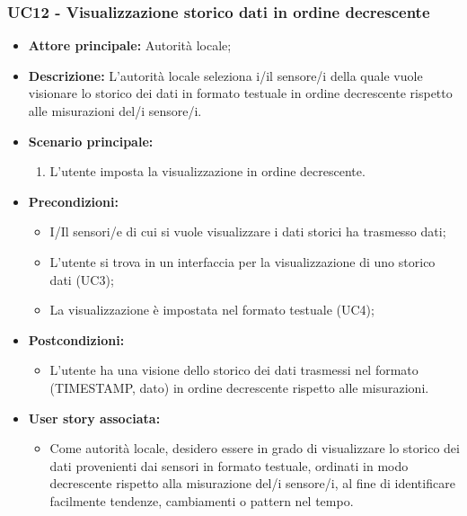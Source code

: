 \subsubsection{UC12 - Visualizzazione storico dati in ordine decrescente}
\begin{itemize}
    \item \textbf{Attore principale:} Autorità locale;
    \item \textbf{Descrizione:} L’autorità locale seleziona i/il sensore/i della quale vuole visionare lo storico dei dati in formato testuale in ordine decrescente rispetto alle misurazioni del/i sensore/i.
    \item \textbf{Scenario principale:}
          \begin{enumerate}
              \item L'utente imposta la visualizzazione in ordine decrescente.
          \end{enumerate}
    \item \textbf{Precondizioni:}
          \begin{itemize}
              \item  I/Il sensori/e di cui si vuole visualizzare i dati storici ha trasmesso dati;
              \item  L'utente si trova in un interfaccia per la visualizzazione di uno storico dati (UC3);
                \item La visualizzazione è impostata nel formato testuale (UC4);

          \end{itemize}
    \item \textbf{Postcondizioni:}
          \begin{itemize}
              \item  L'utente ha una visione dello storico dei dati trasmessi nel formato (TIMESTAMP, dato) in ordine decrescente rispetto alle misurazioni.
          \end{itemize}
    \item \textbf{User story associata:}
          \begin{itemize}
            \item Come autorità locale, desidero essere in grado di visualizzare lo storico dei dati provenienti dai sensori in formato testuale, ordinati in modo decrescente rispetto alla misurazione del/i sensore/i, al fine di identificare facilmente tendenze, cambiamenti o pattern nel tempo.
          \end{itemize}
\end{itemize}